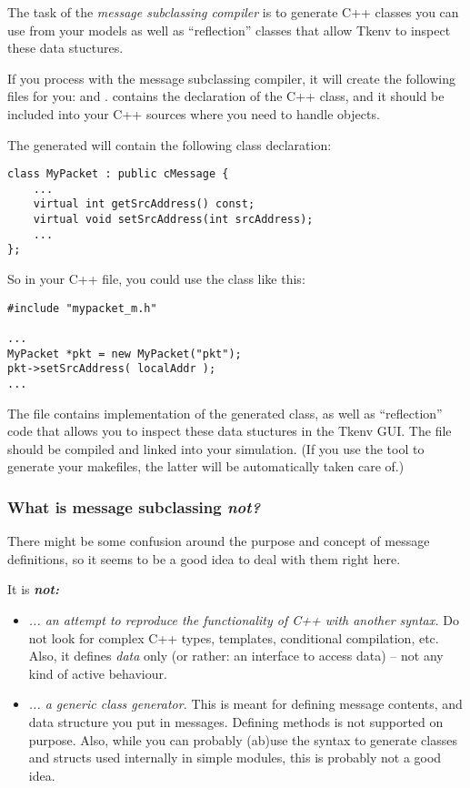 The task of the \textit{message subclassing compiler} is to generate C++ classes
you can use from your models as well as ``reflection'' classes that allow
Tkenv to inspect these data stuctures.

If you process  with the message subclassing compiler, it will
create the following files for you:  and .
 contains the declaration of the  C++ class, and
it should be included into your C++ sources where you need to handle
 objects.

The generated  will contain the following class declaration:

\begin{verbatim}
class MyPacket : public cMessage {
    ...
    virtual int getSrcAddress() const;
    virtual void setSrcAddress(int srcAddress);
    ...
};
\end{verbatim}

So in your C++ file, you could use the  class like this:

\begin{verbatim}
#include "mypacket_m.h"

...
MyPacket *pkt = new MyPacket("pkt");
pkt->setSrcAddress( localAddr );
...
\end{verbatim}

The  file contains implementation of the generated 
class, as well as ``reflection'' code that allows you to inspect these data
stuctures in the Tkenv GUI. The  file should be compiled and
linked into your simulation. (If you use the  tool
to generate your makefiles, the latter will be automatically taken care of.)


\subsubsection{What is message subclassing \textit{not?}}

There might be some confusion around the purpose and
concept of message definitions, so it seems to be a good idea
to deal with them right here.

It is \textit{\textbf{not:}}

\begin{itemize}
  \item{\textit{... an attempt to reproduce the functionality of C++ with another
     syntax.} Do not look for complex C++ types, templates, conditional compilation, etc.
     Also, it defines \textit{data} only (or rather: an interface to access
     data) -- not any kind of active behaviour.}
  \item{\textit{... a generic class generator.} This is meant for defining message
     contents, and data structure you put in messages.
     Defining methods is not supported on purpose.
     Also, while you can probably (ab)use the syntax to
     generate classes and structs used internally in simple modules,
     this is probably not a good idea.}
\end{itemize}

